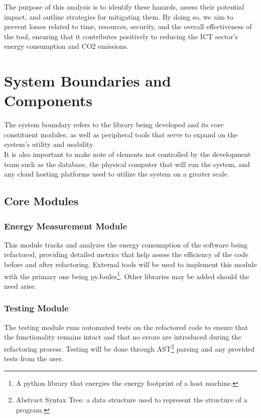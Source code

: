 \documentclass{article}
\begin{document}
The purpose of this analysis is to identify these hazards, assess their potential 
impact, and outline strategies for mitigating them. By doing so, we aim to prevent 
losses related to time, resources, security, and the overall effectiveness of the 
tool, ensuring that it contributes positively to reducing the ICT sector's energy 
consumption and CO2 emissions.

\section{System Boundaries and Components}

The system boundary refers to the library being developed and its core constituent modules, as well as peripheral tools that serve to expand on the system's utility and usability. \\

It is also important to make note of elements not controlled by the development team such as the database, the physical computer that will run the system, and any cloud hosting platforms used to utilize the system on a greater scale.

\subsection{Core Modules}

\subsubsection*{Energy Measurement Module}
This module tracks and analyzes the energy consumption of the software being refactored, providing detailed metrics that help assess the efficiency of the code before and after refactoring. External tools will be used to implement this module with the primary one being pyJoules\footnote{A python library that energies the energy footprint of a host machine.}. Other libraries may be added should the need arise. 

\subsubsection*{Testing Module}
The testing module runs automated tests on the refactored code to ensure that the functionality remains intact and that no errors are introduced during the refactoring process. Testing will be done through AST\footnote{Abstract Syntax Tree: a data structure used to represent the structure of a program.} parsing and any provided tests from the user.
\end{document}
